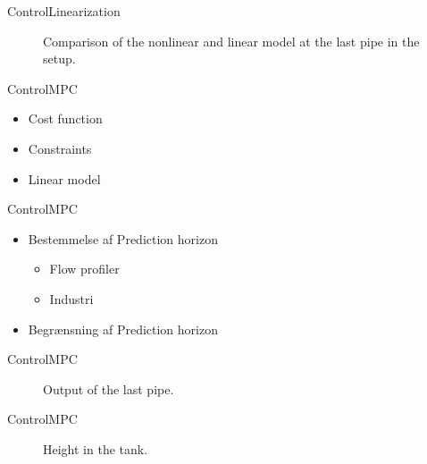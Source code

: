 \begin{frame}{Control}{Linearization}
    
\begin{figure}[H]
\centering

\caption{Comparison of the nonlinear and linear model at the last pipe in the setup.}
\label{fig:linear_nonlinear_comparison_last_pipe}
\end{figure}

\end{frame}

\begin{frame}{Control}{MPC}
    
\begin{itemize}
	\item Cost function
	\item Constraints
	\item Linear model
\end{itemize}

\end{frame}

\begin{frame}{Control}{MPC}
    \begin{itemize}
    	\item Bestemmelse af Prediction horizon
    	\begin{itemize}
    		\item Flow profiler
    		\item Industri 
    	\end{itemize}
    	\item Begrænsning af Prediction horizon
    \end{itemize}


\end{frame}

\begin{frame}{Control}{MPC}
 \begin{figure}[H]
 \centering
 
\caption{Output of the last pipe.}
\label{fig:MPC_test_output_first_test}
\end{figure}   


\end{frame}

\begin{frame}{Control}{MPC}
\begin{figure}[H]
 \centering
 
\caption{Height in the tank.}
\label{fig:tank_height_first_test}
\end{figure}    


\end{frame}

